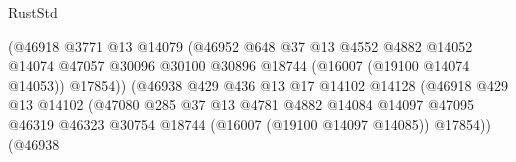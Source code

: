\begin{lexlean}{RustStd}
\begin{coremodule}
                                              (@46918
                                                @3771
                                                @13
                                                @14079
                                                (@46952
                                                  @648
                                                  @37
                                                  @13
                                                  @4552
                                                  @4882
                                                  @14052
                                                  @14074
                                                  @47057
                                                  @30096
                                                  @30100
                                                  @30896
                                                  @18744
                                                  (@16007 (@19100 @14074 @14053))
                                                  @17854))
                                              (@46938
                                                @429
                                                @436
                                                @13
                                                @17
                                                @14102
                                                @14128
                                                (@46918
                                                  @429
                                                  @13
                                                  @14102
                                                  (@47080
                                                    @285
                                                    @37
                                                    @13
                                                    @4781
                                                    @4882
                                                    @14084
                                                    @14097
                                                    @47095
                                                    @46319
                                                    @46323
                                                    @30754
                                                    @18744
                                                    (@16007 (@19100 @14097 @14085))
                                                    @17854))
                                                (@46938

\end{coremodule}
\end{lexlean}
